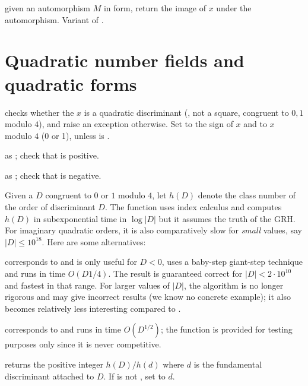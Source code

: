  given an automorphism
$M$ in  form, return the image of $x$ under the
automorphism. Variant of .

\section{Quadratic number fields and quadratic forms}


checks whether the  $x$ is a quadratic discriminant (,
not a square, congruent to $0,1$ modulo $4$), and raise an exception
otherwise. Set  to the sign of $x$ and  to $x$ modulo
$4$ (0 or 1), unless  is .

 as
; check that  is positive.

 as
; check that  is negative.


Given a $D$ congruent to $0$ or $1$ modulo $4$, let $h(D)$ denote the class
number of the order of discriminant $D$.
The function  uses index calculus and computes $h(D)$ in
subexponential time in $\log |D|$ but it assumes the truth of the GRH. For
imaginary quadratic orders, it is also comparatively slow for \emph{small}
values, say $|D|\leq 10^{18}$. Here are some alternatives:

  corresponds to  and is only
useful for $D < 0$, uses a baby-step giant-step technique and runs in time
$O(D{1/4})$. The result is guaranteed correct for $|D| < 2\cdot 10^{10}$
and fastest in that range. For larger values of $|D|$, the algorithm is no
longer rigorous and may give incorrect results (we know no concrete example);
it also becomes relatively less interesting compared to .

  corresponds to  and runs in
time $O(D^{1/2})$; the function is provided for testing purposes only since
it is never competitive.

 returns the positive integer
$h(D)/h(d)$ where $d$ is the fundamental discriminant attached to $D$.
If  is not , set  to $d$.

